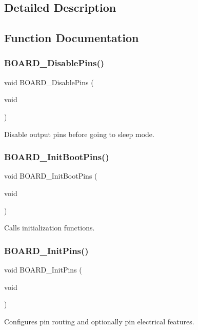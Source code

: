 \subsection{Detailed Description}


\subsection{Function Documentation}
\mbox{\label{group__pin__mux_ga18145d0a226cc9ba105372695e8ade79}} 
\subsubsection{\texorpdfstring{BOARD\_DisablePins()}{BOARD\_DisablePins()}}
{\footnotesize\ttfamily void B\+O\+A\+R\+D\+\_\+\+Disable\+Pins (\begin{DoxyParamCaption}\item[{void}]{ }\end{DoxyParamCaption})}



Disable output pins before going to sleep mode. 

\mbox{\label{group__pin__mux_ga8652eb15efb9dfe7368dd7f292dab554}} 
\subsubsection{\texorpdfstring{BOARD\_InitBootPins()}{BOARD\_InitBootPins()}}
{\footnotesize\ttfamily void B\+O\+A\+R\+D\+\_\+\+Init\+Boot\+Pins (\begin{DoxyParamCaption}\item[{void}]{ }\end{DoxyParamCaption})}



Calls initialization functions. 

\mbox{\label{group__pin__mux_ga2c9fe54b6b84723fbaa590a6f4576966}} 
\subsubsection{\texorpdfstring{BOARD\_InitPins()}{BOARD\_InitPins()}}
{\footnotesize\ttfamily void B\+O\+A\+R\+D\+\_\+\+Init\+Pins (\begin{DoxyParamCaption}\item[{void}]{ }\end{DoxyParamCaption})}



Configures pin routing and optionally pin electrical features. 

